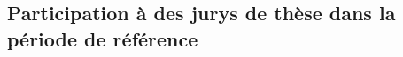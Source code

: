 \documentclass[10pt,french,a4paper,twoside]{article}%
\begin{document}
\begin{itemize}
\end{itemize}


\subsection{Participation à des jurys de thèse dans la période de référence} %
\end{document}
